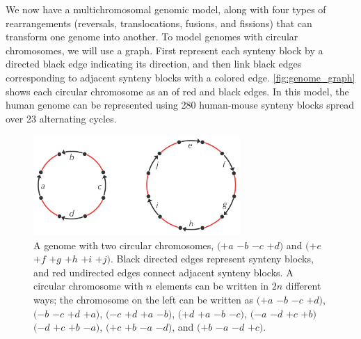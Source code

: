 We now have a multichromosomal genomic model, along with four types of rearrangements (reversals, translocations, fusions, and fissions) that can transform one genome into another. To model genomes with circular chromosomes, we will use a graph.  First represent each synteny block by a directed black edge indicating its direction, and then link black edges corresponding to adjacent synteny blocks with a colored edge. \autoref{fig:genome_graph} shows each circular chromosome as an  of red and black edges. In this model, the human genome can be represented using 280 human-mouse synteny blocks spread over 23 alternating cycles.\par

\begin{figure}[h]
\mySfFamily
\centering
\includegraphics[width = 0.7\textwidth]{images/rearrangements/genome_graph}
\caption{A genome with two circular chromosomes, $(+a$ $-b$ $-c$ $+d)$ and $(+e$ $+f$ $+g$ $+h$ $+i$ $+j)$.  Black directed edges represent synteny blocks, and red undirected edges connect adjacent synteny blocks. A circular chromosome with $n$ elements can be written in $2n$ different ways; the chromosome on the left can be written as $(+a$ $-b$ $-c$ $+d)$, $(-b$ $-c$ $+d$ $+a)$, $(-c$ $+d$ $+a$ $-b)$, $(+d$ $+a$ $-b$ $-c)$, $(-a$ $-d$ $+c$ $+b)$  $(-d$ $+c$ $+b$ $-a)$, $(+c$ $+b$ $-a$ $-d)$, and $(+b$ $-a$ $-d$ $+c)$.}
\label{fig:genome_graph}
\end{figure}

\vspace{\baselineskip}

\begin{qbox}\end{qbox}

